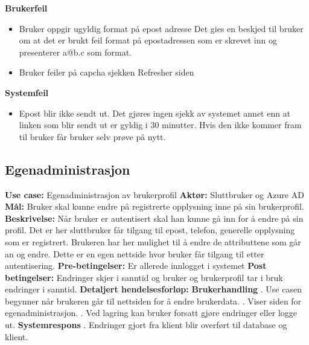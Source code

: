 \noindent \textbf{Brukerfeil}
\begin{itemize}
\item Bruker oppgir ugyldig format på epost adresse
\newline Det gies en beskjed til bruker om at det er brukt feil format på epostadressen som er skrevet inn og presenterer a@b.c som format.
\item Bruker feiler på capcha sjekken
\newline Refresher siden 
\end{itemize}

\bigskip \textbf{Systemfeil}
\begin{itemize}
\item Epost blir ikke sendt ut.
\newline Det gjøres ingen sjekk av systemet annet enn at linken som blir sendt ut er gyldig i 30 minutter. Hvis den ikke kommer fram til bruker får bruker selv prøve på nytt.
\end{itemize}

\subsection{Egenadministrasjon}
\label{subsec:use_case_egenadministrasjon}
\newline \textbf{Use case:} Egenadministrasjon av brukerprofil
\newline \textbf{Aktør:}	Sluttbruker og Azure AD
\newline \textbf{Mål:} Bruker skal kunne endre på registrerte opplysning inne på sin brukerprofil.
\newline \textbf{Beskrivelse:} Når bruker er autentisert skal han kunne gå inn for å endre på sin profil. Det er her sluttbruker får tilgang til epost, telefon, generelle opplysning som er registrert. Brukeren har her mulighet til å endre de attributtene som går an og endre. Dette er en egen nettside hvor bruker får tilgang til etter autentisering.
\newline \textbf{Pre-betingelser:} Er allerede innlogget i systemet
\newline \textbf{Post betingelser:} Endringer skjer i sanntid og bruker og brukerprofil tar i bruk endringer i sanntid.
\newline \textbf{Detaljert hendelsesforløp:}
\newline
\newline \textbf{Brukerhandling}
. Use casen begynner når brukeren går til nettsiden for å endre brukerdata.
. Viser siden for egenadministrasjon.
. Ved lagring kan bruker forsatt gjøre endringer eller logge ut.
\newline
\newline \textbf{Systemrespons}
. Endringer gjort fra klient blir overført til database og klient.
\newline

